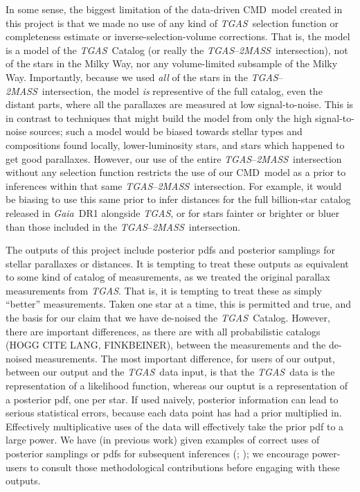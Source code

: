 \documentclass[modern]{aastex61}
\newcommand{\acronym}[1]{{\small{#1}}}
\newcommand{\project}[1]{\textsl{#1}}
\newcommand{\tgas}{\project{\acronym{TGAS}}}
\newcommand{\tmass}{\project{\acronym{2MASS}}}
\newcommand{\gaia}{\project{Gaia}}
\newcommand{\cmd}{\acronym{CMD}}
\begin{document}
In some sense, the biggest limitation of the data-driven \cmd\ model
created in this project is that we made no use of any kind of \tgas\ selection
function or completeness estimate or inverse-selection-volume corrections.
That is, the model is a model of the \tgas\ Catalog
(or really the \tgas--\tmass\ intersection), not of the stars in
the Milky Way, nor any volume-limited subsample of the Milky Way.
Importantly, because we used \emph{all} of the stars in the \tgas--\tmass\
intersection, the model \emph{is} representive of the full catalog,
even the distant parts, where all the parallaxes are measured at low
signal-to-noise.
This is in contrast to techniques that might build the model from only
the high signal-to-noise sources; such a model would be biased towards
stellar types and compositions found locally, lower-luminosity stars,
and stars which happened to get good parallaxes.
However, our use of the entire \tgas--\tmass\ intersection without
any selection function restricts the use of our \cmd\ model as a prior
to inferences within that same \tgas--\tmass\ intersection.
For example, it would be biasing to use this same prior to infer
distances for the full billion-star catalog released in \gaia\ DR1
alongside \tgas, or for stars fainter or brighter or bluer than those
included in the \tgas--\tmass\ intersection.

The outputs of this project include posterior pdfs and posterior
samplings for stellar parallaxes or distances.
It is tempting to treat these outputs as equivalent to some kind of catalog of
measurements, as we treated the original parallax measurements from \tgas.
That is, it is tempting to treat these as simply ``better'' measurements.
Taken one star at a time, this is permitted and true, and the basis for our
claim that we have de-noised the \tgas\ Catalog.
However, there are important differences, as there are with all
probabilistic catalogs (HOGG CITE LANG, FINKBEINER), between the
measurements and the de-noised measurements.
The most important difference, for users of our output, between our
output and the \tgas\ data input, is that the \tgas\ data is the representation
of a likelihood function, whereas our ouptut is a
representation of a posterior pdf, one per star.
If used naively, posterior information can lead to serious statistical
errors, because each data point has had a prior multiplied in.
Effectively multiplicative uses of the data will effectively take the prior
pdf to a large power.
We have (in previous work)
given examples of correct uses of posterior samplings or pdfs
for subsequent inferences (\citealt{hogg08}; \citealt{dfm14}); we
encourage power-users to consult those methodological
contributions before engaging with these outputs.
\end{document}
